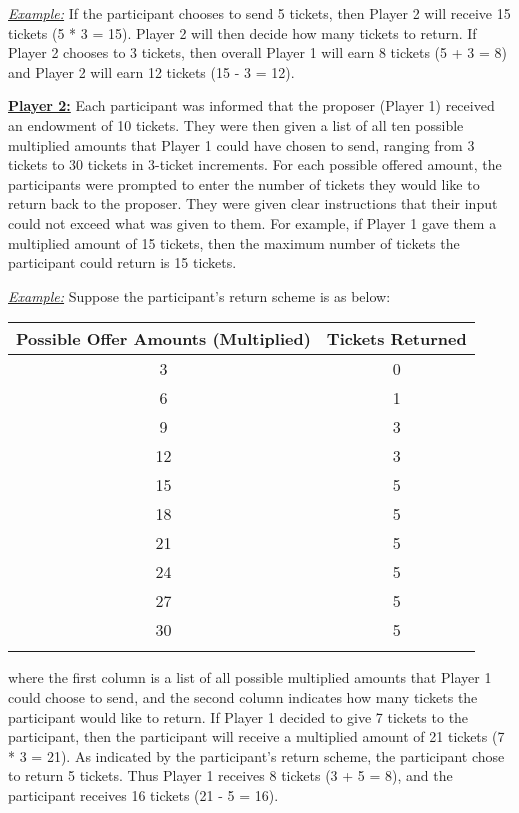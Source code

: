 \documentclass[12pt]{article}
\begin{document}
\underline{\textit{Example:}} If the participant chooses to send 5 tickets, then Player 2 will receive 15 tickets (5 * 3 = 15). Player 2 will then decide how many tickets to return. If Player 2 chooses to 3 tickets, then overall Player 1 will earn 8 tickets (5 + 3 = 8) and Player 2 will earn 12 tickets (15 - 3 = 12).

\underline{\textbf{Player 2:}} Each participant was informed that the proposer (Player 1) received an endowment of 10 tickets. They were then given a list of all ten possible multiplied amounts that Player 1 could have chosen to send, ranging from 3 tickets to 30 tickets in 3-ticket increments. For each possible offered amount, the participants were prompted to enter the number of tickets they would like to return back to the proposer. They were given clear instructions that their input could not exceed what was given to them. For example, if Player 1 gave them a multiplied amount of 15 tickets, then the maximum number of tickets the participant could return is 15 tickets.

\underline{\textit{Example:}} Suppose the participant\rq s return scheme is as below: \\
\onehalfspacing		
\begin{center}
\begin{tabular}{ c c }
\hline \hline
 Possible Offer Amounts (Multiplied) & Tickets Returned \\ 
 \hline
3 & 0  \\  
6 & 1 \\  
9 & 3  \\  
12 & 3  \\  
15 & 5   \\  
18 & 5  \\  
21 & 5 \\  
24 & 5 \\  
27 & 5 \\  
30 & 5 \\  
\hline \hline \\
\end{tabular}
\end{center} 
\doublespacing
where the first column is a list of all possible multiplied amounts that Player 1 could choose to send, and the second column indicates how many tickets the participant would like to return. If Player 1 decided to give 7 tickets to the participant, then the participant will receive a multiplied amount of 21 tickets (7 * 3 = 21). As indicated by the participant\rq s return scheme, the participant chose to return 5 tickets. Thus Player 1 receives 8 tickets (3 + 5 =  8), and the participant receives 16 tickets (21 - 5 = 16).
\end{document}
